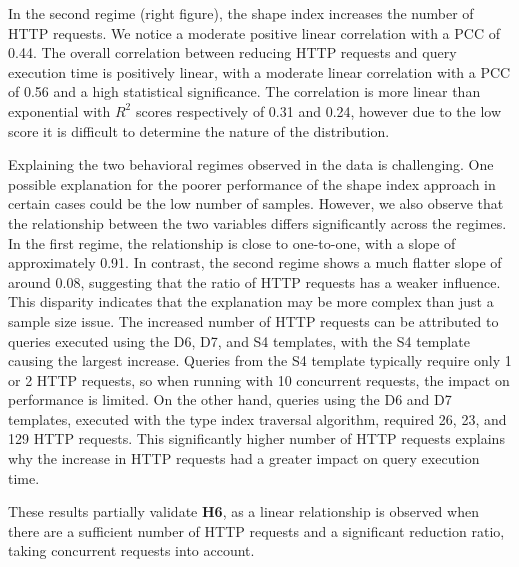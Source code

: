 In the second regime (right figure), the shape index increases the number of HTTP requests.
We notice a moderate positive linear correlation with a PCC of 0.44.
The overall correlation between reducing HTTP requests and query execution time is positively linear, with a moderate linear correlation with a PCC of 0.56 and a high statistical significance.
The correlation is more linear than exponential with $R^2$ scores respectively of 0.31 and 0.24, however due to the low score it is difficult to determine the nature of the distribution.

Explaining the two behavioral regimes observed in the data is challenging.
One possible explanation for the poorer performance of the shape index approach in certain cases could be the low number of samples.
However, we also observe that the relationship between the two variables differs significantly across the regimes.
In the first regime, the relationship is close to one-to-one, with a slope of approximately 0.91.
In contrast, the second regime shows a much flatter slope of around 0.08, suggesting that the ratio of HTTP requests has a weaker influence.
This disparity indicates that the explanation may be more complex than just a sample size issue.
The increased number of HTTP requests can be attributed to queries executed using the D6, D7, and S4 templates, with the S4 template causing the largest increase.
Queries from the S4 template typically require only 1 or 2 HTTP requests, so when running with 10 concurrent requests, the impact on performance is limited.
On the other hand, queries using the D6 and D7 templates, executed with the type index traversal algorithm, required 26, 23, and 129 HTTP requests.
This significantly higher number of HTTP requests explains why the increase in HTTP requests had a greater impact on query execution time.

These results partially validate \textbf{H6}, as a linear relationship is observed when there are a sufficient number of HTTP requests and a significant reduction ratio, taking concurrent requests into account.